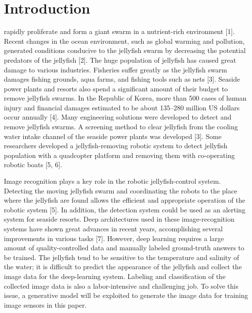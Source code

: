 \documentclass{ieeeaccess}
\begin{document}
\titlepgskip=-15pt

\maketitle

\section{Introduction}
\label{sec:introduction}
 rapidly proliferate and form a giant swarm in a nutrient-rich environment [1]. Recent changes in the ocean environment, such as global warming and pollution, generated conditions conducive to the jellyfish swarm by decreasing the potential predators of the jellyfish [2]. The huge population of jellyfish has caused great damage to various industries. Fisheries suffer greatly as the jellyfish swarm damages fishing grounds, aqua farms, and fishing tools such as nets [3]. Seaside power plants and resorts also spend a significant amount of their budget to remove jellyfish swarms. In the Republic of Korea, more than 500 cases of human injury and financial damages estimated to be about 135--280 million US dollars occur annually [4].
Many engineering solutions were developed to detect and remove jellyfish swarms. A screening method to clear jellyfish from the cooling water intake channel of the seaside power plants was developed [3]. Some researchers developed a jellyfish-removing robotic system to detect jellyfish population with a quadcopter platform and removing them with co-operating robotic boats [5, 6].

Image recognition plays a key role in the robotic jellyfish-control system. Detecting the moving jellyfish swarm and coordinating the robots to the place where the jellyfish are found allows the efficient and appropriate operation of the robotic system [5]. In addition, the detection system could be used as an alerting system for seaside resorts. Deep architectures used in these image-recognition systems have shown great advances in recent years, accomplishing several improvements in various tasks [7]. However, deep learning requires a large amount of quality-controlled data and manually labeled ground-truth answers to be trained. The jellyfish tend to be sensitive to the temperature and salinity of the water; it is difficult to predict the appearance of the jellyfish and collect the image data for the deep-learning system. Labeling and classification of the collected image data is also a labor-intensive and challenging job. To solve this issue, a generative model will be exploited to generate the image data for training image sensors in this paper.
\end{document}
